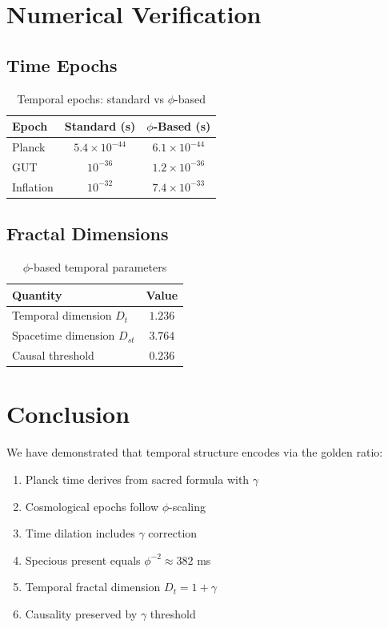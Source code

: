 \documentclass[12pt,a4paper]{article}
\begin{document}
\section{Numerical Verification}

\subsection{Time Epochs}

\begin{table}[h]
\centering
\begin{tabular}{lcc}
\toprule
Epoch & Standard (s) & $\phi$-Based (s) \\
\midrule
Planck & $5.4 \times 10^{-44}$ & $6.1 \times 10^{-44}$ \\
GUT & $10^{-36}$ & $1.2 \times 10^{-36}$ \\
Inflation & $10^{-32}$ & $7.4 \times 10^{-33}$ \\
\bottomrule
\end{tabular}
\caption{Temporal epochs: standard vs $\phi$-based}
\end{table}

\subsection{Fractal Dimensions}

\begin{table}[h]
\centering
\begin{tabular}{lc}
\toprule
Quantity & Value \\
\midrule
Temporal dimension $D_t$ & $1.236$ \\
Spacetime dimension $D_{st}$ & $3.764$ \\
Causal threshold & $0.236$ \\
\bottomrule
\end{tabular}
\caption{$\phi$-based temporal parameters}
\end{table}

\section{Conclusion}

We have demonstrated that temporal structure encodes via the golden ratio:
\begin{enumerate}
\item Planck time derives from sacred formula with $\gamma$
\item Cosmological epochs follow $\phi$-scaling
\item Time dilation includes $\gamma$ correction
\item Specious present equals $\phi^{-2} \approx 382$ ms
\item Temporal fractal dimension $D_t = 1 + \gamma$
\item Causality preserved by $\gamma$ threshold
\end{enumerate}
\end{document}
